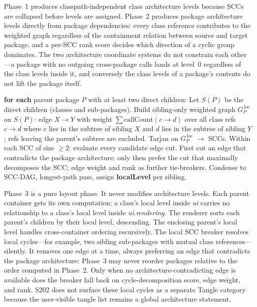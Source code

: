 \documentclass[a4paper,twoside]{article}
\begin{document}
Phase~1 produces classpath-independent class architecture levels because SCCs
are collapsed before levels are assigned. Phase~2 produces package architecture
levels directly from package dependencies: every class reference contributes to the weighted graph regardless of
the containment relation between source and target package, and a per-SCC
rank score decides which direction of a cyclic group dominates. The two
architecture coordinate systems do not constrain each other---a package with
no outgoing cross-package calls lands at level~0 regardless of the class
levels inside it, and conversely the class levels of a package's contents
do not lift the package itself.

\begin{algorithm}[H]
\DontPrintSemicolon
\caption{Phase~3 -- Local Level per Parent Container (\texttt{LocalLevelCalculator}, Step~6)}
\textbf{for each} parent package $P$ with at least two direct children:\;
\Indp
  Let $S(P)$ be the direct children (classes and sub-packages).\;
  Build sibling-only weighted graph $G_P^{\,\text{loc}}$ on $S(P)$:\;
  \hspace{1em} edge $X \to Y$ with weight $\textstyle\sum \text{callCount}(c \to d)$\;
  \hspace{1em} over all class refs $c \to d$ where $c$ lies in the subtree of sibling $X$\;
  \hspace{1em} and $d$ lies in the subtree of sibling $Y$;\;
  \hspace{1em} refs leaving the parent's subtree are excluded.\;
  Tarjan on $G_P^{\,\text{loc}}$ $\rightarrow$ SCCs.\;
  Within each SCC of size $\ge 2$: evaluate every candidate edge cut.\;
  First cut an edge that contradicts the package architecture; only then\;
  prefer the cut that maximally decomposes the SCC; edge weight and rank as further tie-breakers.\;
  Condense to SCC-DAG, longest-path pass, assign \textbf{localLevel} per sibling.\;
\Indm
\end{algorithm}

Phase~3 is a pure layout phase. It never modifies architecture levels. Each
parent container gets its own computation: a class's local level inside
\emph{ui} carries no relationship to a class's local level inside
\emph{ui.rendering}. The renderer sorts each parent's children by their local
level, descending. The enclosing parent's local level handles
cross-container ordering recursively. The local SCC breaker resolves local
cycles---for example, two sibling sub-packages with mutual class
references---silently. It removes one edge at a time, always preferring an
edge that contradicts the package architecture: Phase~3 may never reorder
packages relative to the order computed in Phase~2. Only when no
architecture-contradicting edge is available does the breaker fall back on
cycle-decomposition score, edge weight, and rank. S202 does
not surface these local cycles as a separate Tangle category because the
user-visible tangle list remains a global architecture statement.
\end{document}
